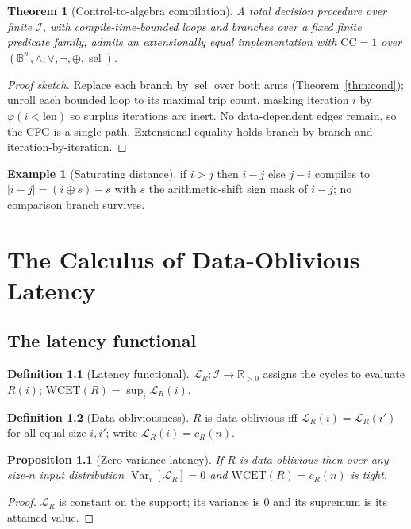 \documentclass[11pt,oneside]{book}
\theoremstyle{definition}
\newtheorem{definition}{Definition}[chapter]
\newtheorem{example}{Example}[chapter]
\theoremstyle{plain}
\newtheorem{theorem}{Theorem}[chapter]
\newtheorem{proposition}{Proposition}[chapter]
\theoremstyle{remark}
\newcommand{\Bits}{\mathbb{B}}
\newcommand{\Word}[1]{\Bits^{#1}}
\newcommand{\sel}{\operatorname{sel}}
\newcommand{\phimap}{\varphi}
\newcommand{\Inputs}{\mathcal{I}}
\newcommand{\Lat}{\mathcal{L}}
\newcommand{\WCET}{\mathrm{WCET}}
\newcommand{\Reals}{\mathbb{R}}
\newcommand{\Rpos}{\Reals_{>0}}
\newcommand{\Var}{\operatorname{Var}}
\begin{document}
\begin{theorem}[Control-to-algebra compilation]\label{thm:compile}
A total decision procedure over finite $\Inputs$, with compile-time-bounded loops and
branches over a fixed finite predicate family, admits an extensionally equal
implementation with $\mathrm{CC}=1$ over $(\Word{w},\wedge,\vee,\neg,\oplus,\sel)$.
\end{theorem}
\begin{proof}[Proof sketch]
Replace each branch by $\sel$ over both arms (Theorem~\ref{thm:cond}); unroll each bounded
loop to its maximal trip count, masking iteration $i$ by $\phimap(i<\text{len})$ so surplus
iterations are inert. No data-dependent edges remain, so the CFG is a single path.
Extensional equality holds branch-by-branch and iteration-by-iteration.
\end{proof}

\begin{example}[Saturating distance]
\textsf{if $i>j$ then $i-j$ else $j-i$} compiles to $\lvert i-j\rvert=(i\oplus s)-s$ with
$s$ the arithmetic-shift sign mask of $i-j$; no comparison branch survives.
\end{example}

\chapter{The Calculus of Data-Oblivious Latency}\label{ch:calculus}

\section{The latency functional}
\begin{definition}[Latency functional]
$\Lat_R:\Inputs\to\Rpos$ assigns the cycles to evaluate $R(i)$;
$\WCET(R)=\sup_i\Lat_R(i)$.
\end{definition}

\begin{definition}[Data-obliviousness]
$R$ is data-oblivious iff $\Lat_R(i)=\Lat_R(i')$ for all equal-size $i,i'$; write
$\Lat_R(i)=c_R(n)$.
\end{definition}

\begin{proposition}[Zero-variance latency]\label{prop:zerovar}
If $R$ is data-oblivious then over any size-$n$ input distribution $\Var_i[\Lat_R]=0$ and
$\WCET(R)=c_R(n)$ is tight.
\end{proposition}
\begin{proof}
$\Lat_R$ is constant on the support; its variance is $0$ and its supremum is its attained
value.
\end{proof}
\end{document}
